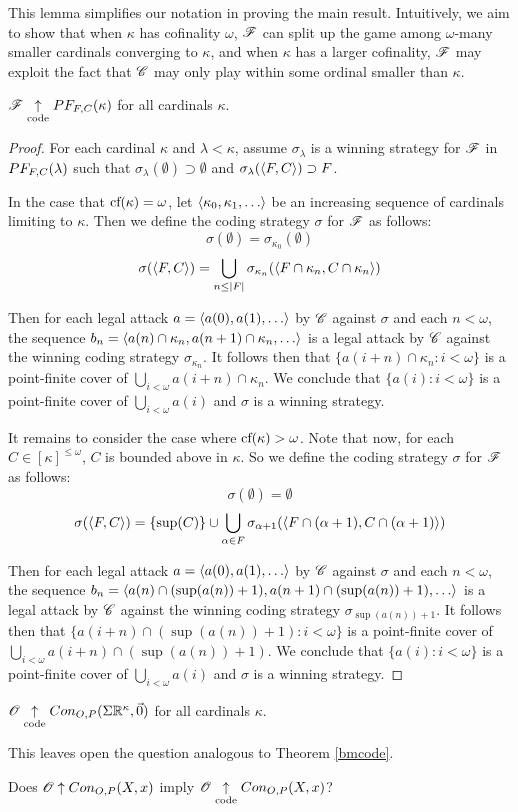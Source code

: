 This lemma simplifies our notation in proving the main result. Intuitively, we
aim to show that when $\kappa$ has cofinality $\omega$, $\mathscr{F}$ can split up
the game among $\omega$-many smaller cardinals converging to $\kappa$, and
when $\kappa$ has a larger cofinality, $\mathscr{F}$ may exploit the fact that $\mathscr{C}$
may only play within some ordinal smaller than $\kappa$.

\begin{thm}
  $\mathscr{F} \underset{\text{code}}{\uparrow} PF_{F,C}(\kappa)$ for all cardinals $\kappa$.
\end{thm}

\begin{proof}
  For each cardinal $\kappa$ and $\lambda<\kappa$,
  assume $\sigma_\lambda$ is a winning strategy for $\mathscr{F}$ in $PF_{F,C}(\lambda)$
  such that $\sigma_\lambda(\emptyset)\supset\emptyset$ and
  $\sigma_\lambda(\langle F,C\rangle)\supset F$.

  In the case that $\textrm{cf}(\kappa)=\omega$, let $\<\kappa_0,\kappa_1,\dots\>$ be
  an increasing sequence of cardinals limiting to $\kappa$. Then we define
  the coding strategy $\sigma$ for $\mathscr{F}$ as follows:
    \[
      \sigma(\emptyset) = \sigma_{\kappa_0}(\emptyset)
    \]
    \[
      \sigma(\langle F,C\rangle)
        =
      \bigcup_{n\leq|F|}
      \sigma_{\kappa_n}(\langle F\cap \kappa_n,C\cap \kappa_n\rangle)
    \]

  Then for each legal attack $a=\<a(0),a(1),\dots\>$ by $\mathscr{C}$ against $\sigma$
  and each $n<\omega$, the sequence
  $b_n=\<a(n)\cap \kappa_n,a(n+1)\cap \kappa_n,\dots\>$
  is a legal attack by $\mathscr{C}$ against the winning coding strategy
  $\sigma_{\kappa_n}$. It follows then that $\{a(i+n)\cap \kappa_n:i<\omega\}$
  is a point-finite cover of $\bigcup_{i<\omega}a(i+n)\cap \kappa_n$. We
  conclude that $\{a(i):i<\omega\}$ is a point-finite cover of
  $\bigcup_{i<\omega}a(i)$ and $\sigma$ is a winning strategy.

  It remains to consider the case where $\textrm{cf}(\kappa)>\omega$. Note that now, for
  each $C\in[\kappa]^{\leq\omega}$, $C$ is bounded above in $\kappa$. So we
  define the coding strategy $\sigma$ for $\mathscr{F}$ as follows:
    \[
      \sigma(\emptyset) = \emptyset
    \]
    \[
      \sigma(\langle F,C\rangle)
        =
      \{\sup(C)\}
        \cup
      \bigcup_{\alpha\in F}
      \sigma_{\alpha+1}(\langle F\cap(\alpha+1),C\cap(\alpha+1)\rangle)
    \]

  Then for each legal attack $a=\<a(0),a(1),\dots\>$ by $\mathscr{C}$ against $\sigma$
  and each $n<\omega$, the sequence
  $b_n=\<a(n)\cap (\sup(a(n))+1),a(n+1)\cap (\sup(a(n))+1),\dots\>$
  is a legal attack by $\mathscr{C}$ against the winning coding strategy
  $\sigma_{\sup(a(n))+1}$. It follows then that
  $\{a(i+n)\cap (\sup(a(n))+1):i<\omega\}$
  is a point-finite cover of $\bigcup_{i<\omega}a(i+n)\cap(\sup(a(n))+1)$. We
  conclude that $\{a(i):i<\omega\}$ is a point-finite cover of
  $\bigcup_{i<\omega}a(i)$ and $\sigma$ is a winning strategy.
\end{proof}

\begin{cor}
  $\mathscr{O}\underset{\text{code}}{\uparrow}Con_{O,P}(\Sigma\mathbb{R}^{\kappa},\vec{0})$
  for all cardinals $\kappa$.
\end{cor}

This leaves open the question analogous to Theorem \ref{bmcode}.

\begin{ques}
  Does $\mathscr{O} \uparrow Con_{O,P}(X,x)$ imply $\mathscr{O} \underset{\text{code}}{\uparrow}Con_{O,P}(X,x)$?
\end{ques}
